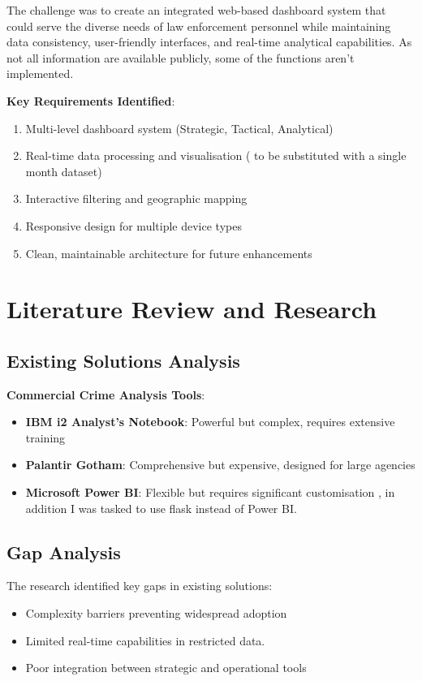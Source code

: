 \documentclass[12pt,a4paper]{article}
\begin{document}
The challenge was to create an integrated web-based dashboard system that could serve the diverse needs of law enforcement personnel 
while maintaining data consistency, user-friendly interfaces, and real-time analytical capabilities. As not all information are available publicly,
some of the functions aren't implemented.

\textbf{Key Requirements Identified}:
\begin{enumerate}
    \item Multi-level dashboard system (Strategic, Tactical, Analytical)
    \item Real-time data processing and visualisation ( to be substituted with a single month dataset)
    \item Interactive filtering and geographic mapping
    \item Responsive design for multiple device types
    \item Clean, maintainable architecture for future enhancements
\end{enumerate}

\section{Literature Review and Research}

\subsection{Existing Solutions Analysis}

\textbf{Commercial Crime Analysis Tools}:
\begin{itemize}
    \item \textbf{IBM i2 Analyst's Notebook}: Powerful but complex, requires extensive training
    \item \textbf{Palantir Gotham}: Comprehensive but expensive, designed for large agencies
    \item \textbf{Microsoft Power BI}: Flexible but requires significant customisation , in addition I was tasked to use flask instead of Power BI.
\end{itemize}



\subsection{Gap Analysis}

The research identified key gaps in existing solutions:
\begin{itemize}
    \item Complexity barriers preventing widespread adoption
    \item Limited real-time capabilities in restricted data.
    \item Poor integration between strategic and operational tools
\end{itemize}
\end{document}

